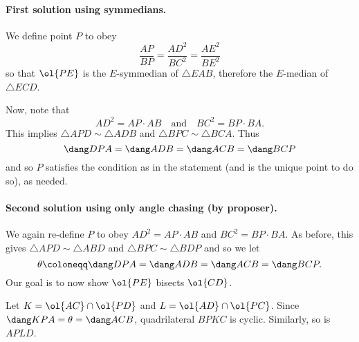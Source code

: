 \documentclass[11pt]{scrartcl}
\begin{document}
\paragraph{First solution using symmedians.}
We define point $P$ to obey
\[ \frac{AP}{BP} = \frac{AD^2}{BC^2} = \frac{AE^2}{BE^2} \]
so that $\ol{PE}$ is the $E$-symmedian of $\triangle EAB$,
therefore the $E$-median of $\triangle ECD$.

Now, note that
\[ AD^2 = AP \cdot AB \quad\text{and}\quad BC^2 = BP \cdot BA. \]
This implies $\triangle APD \sim \triangle ADB$ and $\triangle BPC \sim \triangle BCA$.
Thus
\[ \dang DPA = \dang ADB = \dang ACB = \dang BCP \]
and so $P$ satisfies the condition as in the statement
(and is the unique point to do so), as needed.

\paragraph{Second solution using only angle chasing (by proposer).}
We again re-define $P$ to obey $AD^2 = AP \cdot AB$ and $BC^2 = BP \cdot BA$.
As before, this gives $\triangle APD \sim \triangle ABD$
and $\triangle BPC \sim \triangle BDP$ and so we let
\[ \theta \coloneqq \dang DPA = \dang ADB = \dang ACB = \dang BCP. \]
Our goal is to now show $\ol{PE}$ bisects $\ol{CD}$.

Let $K = \ol{AC} \cap \ol{PD}$ and $L = \ol{AD} \cap \ol{PC}$.
Since $\dang KPA = \theta = \dang ACB$, quadrilateral $BPKC$ is cyclic.
Similarly, so is $APLD$.
\end{document}
